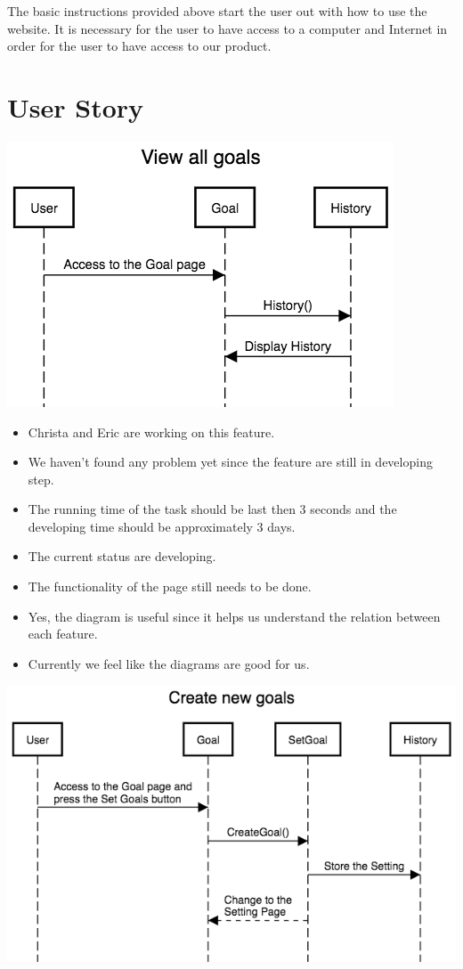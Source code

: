 \documentclass[a4paper]{article}
\begin{document}
\noindent 
The basic instructions provided above start the user out with how to use the website. It is necessary for the user to have access to a computer and Internet in order for the user to have access to our product.  


\section{User Story}
\includegraphics[width=\textwidth]{View_all_goals.png} 
\newline
\newline
\newline
\begin{itemize}
  \item Christa and Eric are working on this feature.
  \item We haven't found any problem yet since the feature are still in developing step.
  \item The running time of the task should be last then 3 seconds and the developing time should be approximately 3 days.
  \item The current status are developing.
  \item The functionality of the page still needs to be done.
  \item Yes, the diagram is useful since it helps us understand the relation between each feature.
  \item Currently we feel like the diagrams are good for us.
\end{itemize}
\includegraphics[width=\textwidth]{Create_new_goals.png}
\end{document}
